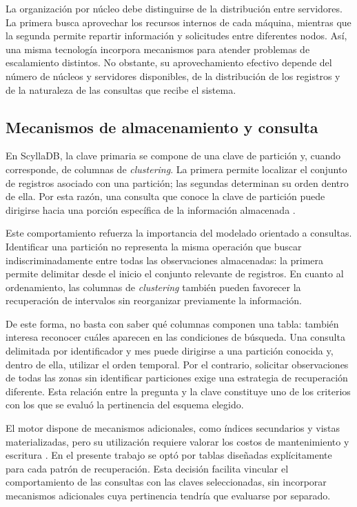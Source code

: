 \documentclass[conference]{IEEEtran}
\begin{document}
La organización por núcleo debe distinguirse de la distribución entre servidores. La primera busca aprovechar los recursos internos de cada máquina, mientras que la segunda permite repartir información y solicitudes entre diferentes nodos. Así, una misma tecnología incorpora mecanismos para atender problemas de escalamiento distintos. No obstante, su aprovechamiento efectivo depende del número de núcleos y servidores disponibles, de la distribución de los registros y de la naturaleza de las consultas que recibe el sistema.

\subsection{Mecanismos de almacenamiento y consulta}

En ScyllaDB, la clave primaria se compone de una clave de partición y, cuando corresponde, de columnas de \textit{clustering}. La primera permite localizar el conjunto de registros asociado con una partición; las segundas determinan su orden dentro de ella. Por esta razón, una consulta que conoce la clave de partición puede dirigirse hacia una porción específica de la información almacenada \cite{scylla_cql}.

Este comportamiento refuerza la importancia del modelado orientado a consultas. Identificar una partición no representa la misma operación que buscar indiscriminadamente entre todas las observaciones almacenadas: la primera permite delimitar desde el inicio el conjunto relevante de registros. En cuanto al ordenamiento, las columnas de \textit{clustering} también pueden favorecer la recuperación de intervalos sin reorganizar previamente la información.

De este forma, no basta con saber qué columnas componen una tabla: también interesa reconocer cuáles aparecen en las condiciones de búsqueda. Una consulta delimitada por identificador y mes puede dirigirse a una partición conocida y, dentro de ella, utilizar el orden temporal. Por el contrario, solicitar observaciones de todas las zonas sin identificar particiones exige una estrategia de recuperación diferente. Esta relación entre la pregunta y la clave constituye uno de los criterios con los que se evaluó la pertinencia del esquema elegido.

El motor dispone de mecanismos adicionales, como índices secundarios y vistas materializadas, pero su utilización requiere valorar los costos de mantenimiento y escritura \cite{scylla_cql}. En el presente trabajo se optó por tablas diseñadas explícitamente para cada patrón de recuperación. Esta decisión facilita vincular el comportamiento de las consultas con las claves seleccionadas, sin incorporar mecanismos adicionales cuya pertinencia tendría que evaluarse por separado.
\end{document}
